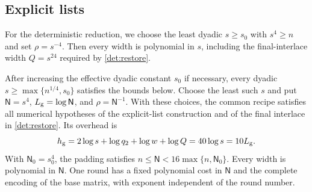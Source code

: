 \documentclass[11pt,letterpaper]{article} \usepackage[utf8]{inputenc}
\theoremstyle{plain} \newtheorem{theorem}{Theorem}[section]
\theoremstyle{definition} \newaliascnt{definition}{theorem}
\begin{document}
\subsection{Explicit lists}

For the deterministic reduction, we choose the least dyadic $s\ge s_0$ with
$s^4\ge n$ and set $\rho=s^{-4}$. Then every width is polynomial in $s$,
including the final-interlace width $Q=s^{24}$ required by \cref{det:restore}.

\begin{lemma}\label{lem:generated-schedule}
After increasing the effective dyadic constant $s_0$ if necessary, every
dyadic $s\ge\max\{n^{1/4},s_0\}$ satisfies the bounds below. Choose the least such $s$ and put
$\mathsf N=s^4$, $L_{\rm g}=\log\mathsf N$, and $\rho=\mathsf N^{-1}$.
With these choices, the common recipe satisfies all numerical hypotheses of the explicit-list
construction and of the final interlace in \cref{det:restore}. Its overhead is
\[
h_{\rm g}=2\log s+\log q_2+\log w+\log Q
=40\log s=10L_{\rm g}.
\]
With $\mathsf N_0=s_0^4$, the padding satisfies
$n\le\mathsf N<16\max\{n,\mathsf N_0\}$. Every width is polynomial in
$\mathsf N$. One round has a fixed polynomial cost in $\mathsf N$ and the
complete encoding of the base matrix, with exponent independent of the round number.
\end{lemma}
\end{document}

